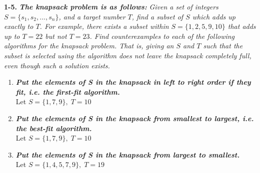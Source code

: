 \textbf{1-5.} \emph{\textbf{The knapsack problem is as follows:}} \emph{Given a set of integers $S = \{s_{1}, s_{2},...,s_{n}\}$,
and a target number $T$, find a subset of $S$ which adds up exactly to $T$. For example,
there exists a subset within $S = \{1, 2, 5, 9, 10\}$ that adds up to $T = 22$ but not
$T = 23$.
Find counterexamples to each of the following algorithms for the knapsack problem.
That is, giving an $S$ and $T$ such that the subset is selected using the algorithm does
not leave the knapsack completely full, even though such a solution exists.}
\begin{enumerate}[label=(\alph*)]
\itemsep1pt\parskip0pt
	\item{\emph{\textbf{Put the elements of S in the knapsack in left to right order if they fit, i.e. the first-fit algorithm.}} \\
		\textcolor{answer}{Let $S = \{1,7,9\}, \; T = 10$}
	}
	\item{\emph{\textbf{Put the elements of S in the knapsack from smallest to largest, i.e. the best-fit algorithm.}} \\
		\textcolor{answer}{Let $S = \{1,7,9\}, \; T = 10$}
	}
	\item{\emph{\textbf{Put the elements of S in the knapsack from largest to smallest.}} \\
		\textcolor{answer}{Let $S = \{1,4,5,7,9\}, \; T = 19$}
	}
\end{enumerate}





